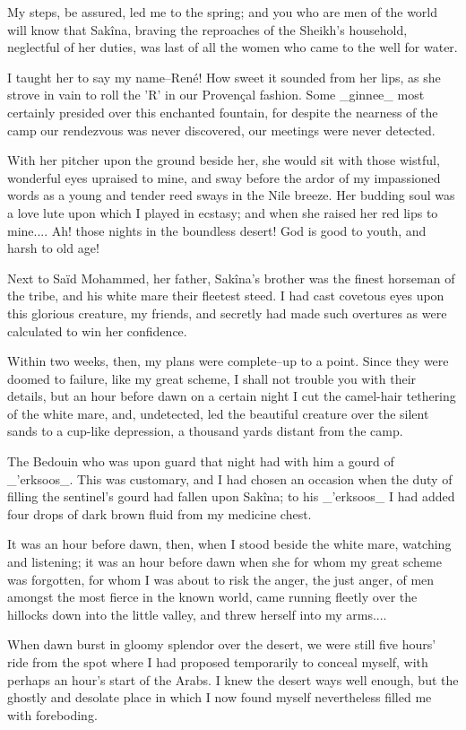 My steps, be assured, led me to the spring; and you who are men of the
world will know that Sakîna, braving the reproaches of the Sheikh's
household, neglectful of her duties, was last of all the women who
came to the well for water.

I taught her to say my name--René! How sweet it sounded from her lips,
as she strove in vain to roll the 'R' in our Provençal fashion. Some
_ginnee_ most certainly presided over this enchanted fountain, for
despite the nearness of the camp our rendezvous was never discovered,
our meetings were never detected.

With her pitcher upon the ground beside her, she would sit with those
wistful, wonderful eyes upraised to mine, and sway before the ardor of
my impassioned words as a young and tender reed sways in the Nile
breeze. Her budding soul was a love lute upon which I played in
ecstasy; and when she raised her red lips to mine.... Ah! those nights
in the boundless desert! God is good to youth, and harsh to old age!

Next to Saïd Mohammed, her father, Sakîna's brother was the finest
horseman of the tribe, and his white mare their fleetest steed. I
had cast covetous eyes upon this glorious creature, my friends, and
secretly had made such overtures as were calculated to win her
confidence.

Within two weeks, then, my plans were complete--up to a point. Since
they were doomed to failure, like my great scheme, I shall not trouble
you with their details, but an hour before dawn on a certain night I
cut the camel-hair tethering of the white mare, and, undetected, led
the beautiful creature over the silent sands to a cup-like depression,
a thousand yards distant from the camp.

The Bedouin who was upon guard that night had with him a gourd of
_'erksoos_. This was customary, and I had chosen an occasion when the
duty of filling the sentinel's gourd had fallen upon Sakîna; to his
_'erksoos_ I had added four drops of dark brown fluid from my medicine
chest.

It was an hour before dawn, then, when I stood beside the white mare,
watching and listening; it was an hour before dawn when she for whom
my great scheme was forgotten, for whom I was about to risk the anger,
the just anger, of men amongst the most fierce in the known world,
came running fleetly over the hillocks down into the little valley,
and threw herself into my arms....

When dawn burst in gloomy splendor over the desert, we were still five
hours' ride from the spot where I had proposed temporarily to conceal
myself, with perhaps an hour's start of the Arabs. I knew the desert
ways well enough, but the ghostly and desolate place in which I now
found myself nevertheless filled me with foreboding.

